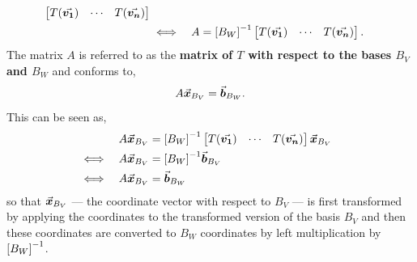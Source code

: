\documentclass[MathsNotesBase.tex]{subfiles}
\begin{document}
{\begin{align*}
\begin{bmatrix}
					T(\vec{\bm{v_1}}) & \cdots & T(\vec{\bm{v_n}})
					\end{bmatrix} \\
		&\iff & A &= {[B_W]}^{-1}\begin{bmatrix}
					T(\vec{\bm{v_1}}) & \cdots & T(\vec{\bm{v_n}})
					\end{bmatrix}. &\text{\scriptsize{}} \\
		\end{align*}		
		The matrix $A$ is referred to as the \textbf{matrix of $T$ with respect to the bases $B_V$ and $B_W$} and conforms to,
		\[ A\vec{\bm{x}}_{B_V} = \vec{\bm{b}}_{B_W}. \]
		This can be seen as,
		\begin{align*}
		&& A\vec{\bm{x}}_{B_V} &= {[B_W]}^{-1}\begin{bmatrix}
						T(\vec{\bm{v_1}}) & \cdots & T(\vec{\bm{v_n}})
						\end{bmatrix}\vec{\bm{x}}_{B_V} \\
		&\iff & A\vec{\bm{x}}_{B_V} &= {[B_W]}^{-1}\vec{\bm{b}}_{B_V} &\text{\scriptsize{}} \\
		&\iff & A\vec{\bm{x}}_{B_V} &= \vec{\bm{b}}_{B_W} &\text{\scriptsize{}} \\
		\end{align*}
		so that ${ \vec{\bm{x}}_{B_V} }$ --- the coordinate vector with respect to $B_V$ --- is first transformed by applying the coordinates to the transformed version of the basis $B_V$ and then these coordinates are converted to $B_W$ coordinates by left multiplication by ${[B_W]}^{-1}$.\\\\		
		
		\medskip
}
\end{document}
